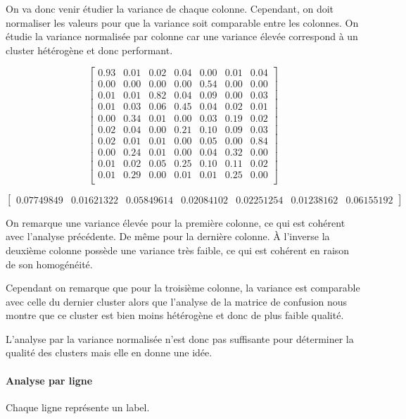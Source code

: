 \documentclass[french,a4paper,18pt]{article}
\begin{document}
On va donc venir étudier la variance de chaque colonne. 
Cependant, on doit normaliser les valeurs pour que la variance soit comparable entre les colonnes.
On étudie la variance normalisée par colonne car une variance élevée correspond à un cluster hétérogène et donc performant.

\[
\begin{bmatrix}
    0.93 & 0.01 & 0.02 & 0.04 & 0.00 & 0.01 & 0.04 \\
    0.00 & 0.00 & 0.00 & 0.00 & 0.54 & 0.00 & 0.00 \\
    0.01 & 0.01 & 0.82 & 0.04 & 0.09 & 0.00 & 0.03 \\
    0.01 & 0.03 & 0.06 & 0.45 & 0.04 & 0.02 & 0.01 \\
    0.00 & 0.34 & 0.01 & 0.00 & 0.03 & 0.19 & 0.02 \\
    0.02 & 0.04 & 0.00 & 0.21 & 0.10 & 0.09 & 0.03 \\
    0.02 & 0.01 & 0.01 & 0.00 & 0.05 & 0.00 & 0.84 \\
    0.00 & 0.24 & 0.01 & 0.00 & 0.04 & 0.32 & 0.00 \\
    0.01 & 0.02 & 0.05 & 0.25 & 0.10 & 0.11 & 0.02 \\
    0.01 & 0.29 & 0.00 & 0.01 & 0.01 & 0.25 & 0.00 \\
\end{bmatrix}
\]

\[
\begin{bmatrix}
    0.07749849 & 0.01621322 & 0.05849614 & 0.02084102 & 0.02251254 & 0.01238162 & 0.06155192
\end{bmatrix}
\]

On remarque une variance élevée pour la première colonne, ce qui est cohérent avec l'analyse précédente.
De même pour la dernière colonne.
À l'inverse la deuxième colonne possède une variance très faible, ce qui est cohérent en raison 
de son homogénéité.

Cependant on remarque que pour la troisième colonne, la variance est comparable avec celle du dernier cluster
alors que l'analyse de la matrice de confusion nous montre que ce cluster est bien moins hétérogène et donc de plus faible qualité.

L'analyse par la variance normalisée n'est donc pas suffisante pour déterminer la qualité des clusters mais 
elle en donne une idée.

\paragraph{Analyse par ligne}
Chaque ligne représente un label.
\end{document}
